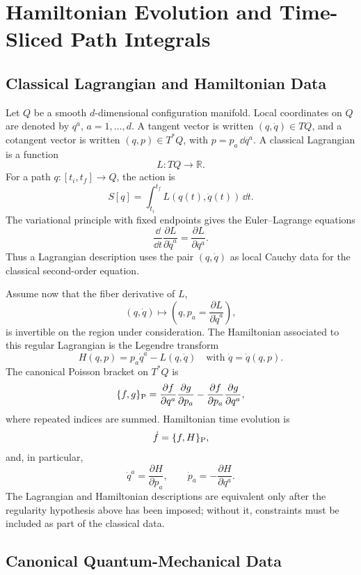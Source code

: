 \chapter{Hamiltonian Evolution and Time-Sliced Path Integrals}
\label{ch:hamiltonian-evolution-time-sliced-path-integrals}
\ConventionsRealTime


\section{Classical Lagrangian and Hamiltonian Data}

\begin{definition}
\label{def:regular-classical-lagrangian-datum}
Let \(Q\) be a smooth \(d\)-dimensional configuration manifold.  Local
coordinates on \(Q\) are denoted by \(q^a\), \(a=1,\ldots,d\).  A tangent
vector is written \((q,\dot q)\in TQ\), and a cotangent vector is written
\((q,p)\in T^*Q\), with \(p=p_a\,\dd q^a\).  A classical Lagrangian is a
function
\[
  L:TQ\to\mathbb R.
\]
For a path \(q:[t_i,t_f]\to Q\), the action is
\[
  S[q]=\int_{t_i}^{t_f}L(q(t),\dot q(t))\,\dd t .
\]
The variational principle with fixed endpoints gives the Euler--Lagrange
equations
\[
  \frac{\dd}{\dd t}\frac{\partial L}{\partial \dot q^a}
  =
  \frac{\partial L}{\partial q^a}.
\]
Thus a Lagrangian description uses the pair \((q,\dot q)\) as local Cauchy
data for the classical second-order equation.

Assume now that the fiber derivative of \(L\),
\[
  (q,\dot q)\longmapsto
  \left(q,p_a=\frac{\partial L}{\partial\dot q^a}\right),
\]
is invertible on the region under consideration.  The Hamiltonian associated
to this regular Lagrangian is the Legendre transform
\[
  H(q,p)=p_a\dot q^a-L(q,\dot q)
  \quad
  \text{with }\dot q=\dot q(q,p).
\]
The canonical Poisson bracket on \(T^*Q\) is
\[
  \{f,g\}_{\rm P}
  =
  \frac{\partial f}{\partial q^a}\frac{\partial g}{\partial p_a}
  -
  \frac{\partial f}{\partial p_a}\frac{\partial g}{\partial q^a},
\]
where repeated indices are summed.  Hamiltonian time evolution is
\[
  \dot f=\{f,H\}_{\rm P},
\]
and, in particular,
\[
  \dot q^a=\frac{\partial H}{\partial p_a},
  \qquad
  \dot p_a=-\frac{\partial H}{\partial q^a}.
\]
The Lagrangian and Hamiltonian descriptions are equivalent only after the
regularity hypothesis above has been imposed; without it, constraints must be
included as part of the classical data.
\end{definition}

\section{Canonical Quantum-Mechanical Data}

